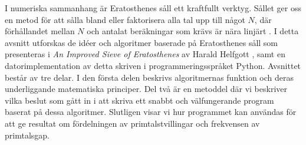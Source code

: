 
I numeriska sammanhang är Eratosthenes såll ett kraftfullt verktyg.
Sållet ger oss en metod för att sålla bland eller faktorisera alla tal upp till något $N$,
där förhållandet mellan $N$ och antalat beräkningar som krävs är nära linjärt \cite[s.333]{HaraldSieve}.
I detta avsnitt utforskas de idéer och algoritmer baserade på Eratosthenes såll som presenteras i \textit{An Improved Sieve of Eratosthenes} av Harald Helfgott \cite{HaraldSieve}, samt en datorimplementation av detta skriven i programmeringsspråket Python. 
Avsnittet består av tre delar.
I den första delen beskrivs algoritmernas funktion och deras underliggande matematiska principer.
Del två är en metoddel där vi beskriver vilka beslut som gått in i att skriva ett snabbt och välfungerande program baserat på dessa algoritmer.
Slutligen visar vi hur programmet kan användas för att ge resultat om fördelningen av primtalstvillingar och frekvensen av primtalsgap.